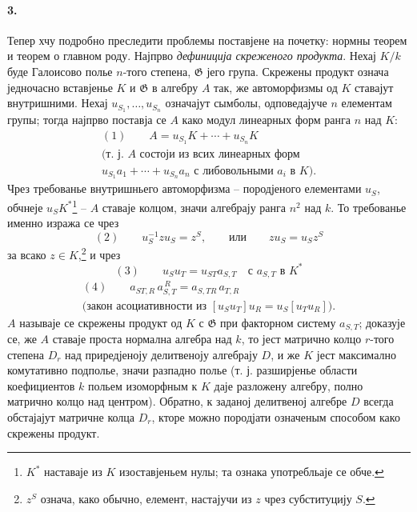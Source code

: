 ﻿\documentclass[11pt]{article}
\begin{document}
\paragraph{3.}
Тепер хчу подробно преследити проблемы поставјене на почетку: нормны теорем и теорем о главном роду. Најпрво \emph{дефиниција скреженого продукта}. Нехај \(K/k\) буде Галоисово полье \(n\)-того степена, \(\mathfrak G\) јего група. Скрежены продукт означа једночасно вставјенье \(K\) и \(\mathfrak G\) в алгебру \(A\) так, же автоморфизмы од \(K\) ставајут внутришними. Нехај \(u_{S_1},\ldots,u_{S_n}\) означајут сымболы, одповедајуче \(n\) елементам групы; тогда најпрво поставја се \(A\) како модул линеарных форм ранга \(n\) над \(K\):
\[
\begin{gathered}
(1)\qquad A=u_{S_1}K+\cdots+u_{S_n}K\\
\text{(т. ј. \(A\) состоји из всих линеарных форм}\\
\text{\(u_{S_1}a_1+\cdots+u_{S_n}a_n\) с либовольными \(a_i\) в \(K\)).}
\end{gathered}
\]
Чрез требованье внутришньего автоморфизма -- породјеного елементами \(u_S\), обчнеје \(u_SK^\ast\)\footnote{\(K^\ast\) наставаје из \(K\) изоставјеньем нулы; та ознака употребльаје се обче.} -- \(A\) ставаје колцом, значи алгебрају ранга \(n^2\) над \(k\). То требованье именно изража се чрез
\[
(2)\qquad u_S^{-1}zu_S=z^S,\qquad \text{или}\qquad zu_S=u_Sz^S
\]
за всако \(z\in K\),\footnote{\(z^S\) означа, како обычно, елемент, настајучи из \(z\) чрез субституцију \(S\).} и чрез
\[
(3)\qquad u_Su_T=u_{ST}a_{S,T}\quad \text{с }a_{S,T}\text{ в }K^\ast
\]
\[
\begin{gathered}
(4)\qquad a_{ST,R}\,a_{S,T}^{\,R}=a_{S,TR}\,a_{T,R}\\
\text{(закон асоциативности из \([u_Su_T]u_R=u_S[u_Tu_R]\)).}
\end{gathered}
\]
\(A\) называје се скрежены продукт од \(K\) с \(\mathfrak G\) при факторном систему \(a_{S,T}\); доказује се, же \(A\) ставаје проста нормална алгебра над \(k\), то јест матрично колцо \(r\)-того степена \(D_r\) над приредјеноју делитвеноју алгебрају \(D\), и же \(K\) јест максимално комутативно подполье, значи разпадно полье (т. ј. разширјенье области коефициентов \(k\) польем изоморфным к \(K\) даје разложену алгебру, полно матрично колцо над центром). Обратно, к заданој делитвеној алгебре \(D\) всегда обстајајут матричне колца \(D_r\), кторе можно породјати означеным способом како скрежены продукт.
\end{document}
